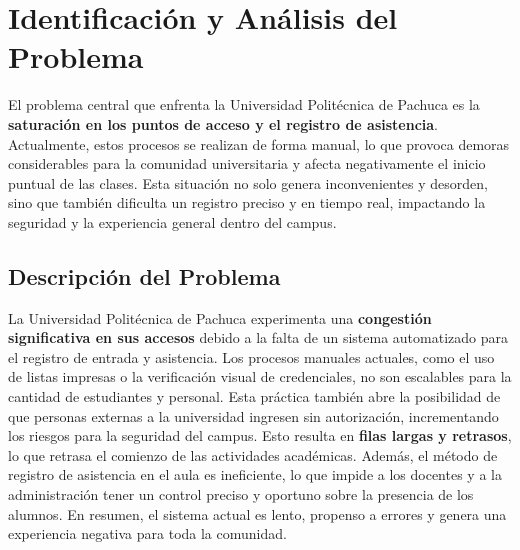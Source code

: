 \section{Identificación y Análisis del Problema}
El problema central que enfrenta la Universidad Politécnica de Pachuca es la \textbf{saturación en los puntos de acceso y el registro de asistencia}. Actualmente, estos procesos se realizan de forma manual, lo que provoca demoras considerables para la comunidad universitaria y afecta negativamente el inicio puntual de las clases. Esta situación no solo genera inconvenientes y desorden, sino que también dificulta un registro preciso y en tiempo real, impactando la seguridad y la experiencia general dentro del campus.

\subsection{Descripción del Problema}
La Universidad Politécnica de Pachuca experimenta una \textbf{congestión significativa en sus accesos} debido a la falta de un sistema automatizado para el registro de entrada y asistencia. Los procesos manuales actuales, como el uso de listas impresas o la verificación visual de credenciales, no son escalables para la cantidad de estudiantes y personal. Esta práctica también abre la posibilidad de que personas externas a la universidad ingresen sin autorización, incrementando los riesgos para la seguridad del campus. Esto resulta en \textbf{filas largas y retrasos}, lo que retrasa el comienzo de las actividades académicas. Además, el método de registro de asistencia en el aula es ineficiente, lo que impide a los docentes y a la administración tener un control preciso y oportuno sobre la presencia de los alumnos. En resumen, el sistema actual es lento, propenso a errores y genera una experiencia negativa para toda la comunidad.


